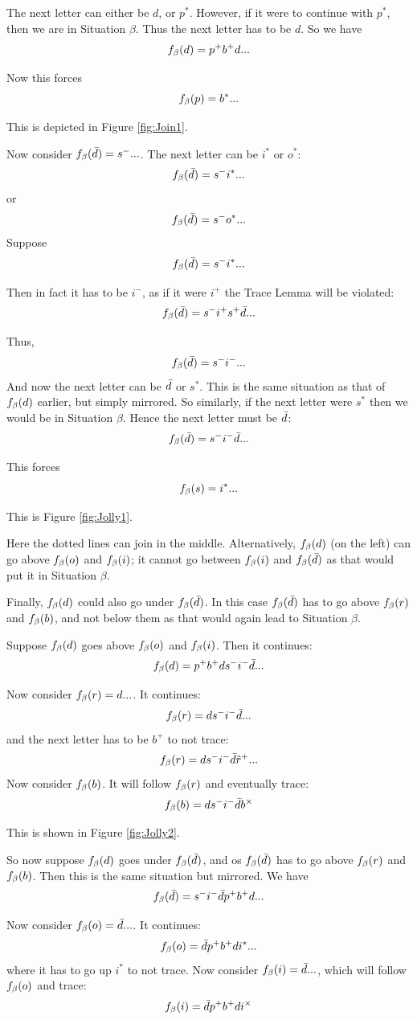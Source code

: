 The next letter can either be $d$, or $p^*$. However, if it were to continue with $p^*$, then we are in Situation $\beta$. Thus the next letter has to be $d$. So we have
\[
f_\beta(d) = p^+ b^+ d...
\]

Now this forces
\[
f_\beta(p) = b^*...
\]

This is depicted in Figure \ref{fig:Join1}.

Now consider $f_\beta(\bar{d}) = s^-...$. The next letter can be $i^*$ or $o^*$:
\[
f_\beta(\bar{d}) = s^- i^*...
\]
or 
\[
f_\beta(\bar{d}) = s^- o^*...
\]
 \label{Jolly}
Suppose
\[
f_\beta(\bar{d}) = s^- i^*...
\]

Then in fact it has to be $i^-$, as if it were $i^+$ the Trace Lemma will be violated:
\[
f_\beta(\bar{d}) = s^- i^+ s^+ \bar{d}...
\]

Thus,
\[
f_\beta(\bar{d}) = s^- i^-...
\]
And now the next letter can be $\bar{d}$ or $s^*$. This is the same situation as that of $f_\beta(d)$ earlier, but simply mirrored. So similarly, if the next letter were $s^*$ then we would be in Situation $\beta$. Hence the next letter must be $\bar{d}$:
\[
f_\beta(\bar{d}) = s^- i^- \bar{d}...
\]

This forces
\[
f_\beta(s) = i^*...
\]

This is Figure \ref{fig:Jolly1}.

Here the dotted lines can join in the middle. Alternatively, $f_\beta(d)$ (on the left) can go above $f_\beta(o)$ and $f_\beta(i)$; it cannot go between $f_\beta(i)$ and $f_\beta(\bar{d})$ as that would put it in Situation $\beta$.

Finally, $f_\beta(d)$ could also go under $f_\beta(\bar{d})$. In this case $f_\beta(\bar{d})$ has to go above $f_\beta(r)$ and $f_\beta(b)$, and not below them as that would again lead to Situation $\beta$.

Suppose $f_\beta(d)$ goes above $f_\beta(o)$ and $f_\beta(i)$. Then it continues:
\[
f_\beta(d) = p^+ b^+ d s^- i^- \bar{d}...
\]

Now consider $f_\beta(r) = d...$. It continues:
\[
f_\beta(r) = d s^- i^- \bar{d}...
\]
and the next letter has to be $b^+$ to not trace:
\[
f_\beta(r) = d s^- i^- \bar{d} \hat{r}^+...
\]
Now consider $f_\beta(b)$. It will follow $f_\beta(r)$ and eventually trace:
\[
f_\beta(b) = d s^- i^- \bar{d} b^\times
\]

This is shown in Figure \ref{fig:Jolly2}.

So now suppose $f_\beta(d)$ goes under $f_\beta(\bar{d})$, and os $f_\beta(\bar{d})$ has to go above $f_\beta(r)$ and $f_\beta(b)$. Then this is the same situation but mirrored. We have
\[
f_\beta(\bar{d}) = s^- i^- \bar{d} p^+ b^+ d...
\]

Now consider $f_\beta(o) = \bar{d}...$. It continues:
\[
f_\beta(o) = \bar{d} p^+ b^+ d i^*...
\]
where it has to go up $i^*$ to not trace. Now consider $f_\beta(i) = \bar{d}...$, which will follow $f_\beta(o)$ and trace:
\[
f_\beta(i) = \bar{d} p^+ b^+ d i^\times
\]

